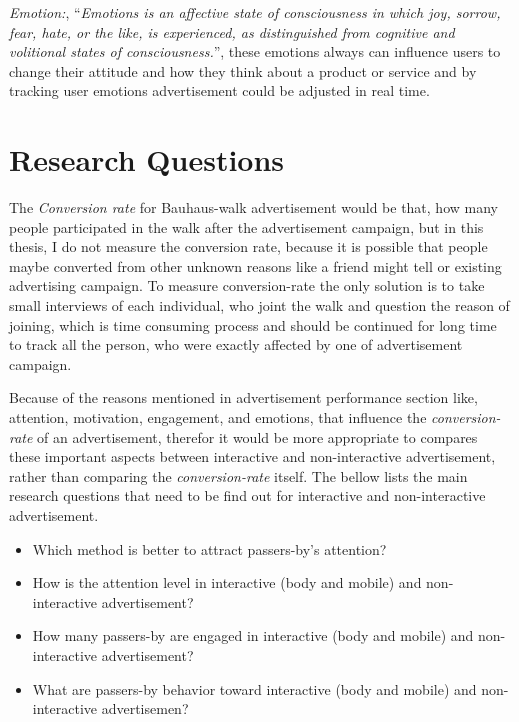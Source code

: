 \emph{Emotion:}, ``\emph{Emotions is an affective state of consciousness in which joy, sorrow, fear, hate, or the like, is experienced, as distinguished from cognitive and volitional states of consciousness.}''\cite{emotiondef}, these emotions always can influence users to change their attitude and how they think about a product or service and by tracking user emotions advertisement could be adjusted in real time.




\section{Research Questions}
The \emph{Conversion rate} for Bauhaus-walk advertisement would be that, how many people participated in the walk after the advertisement campaign, but in this thesis, I do not measure the conversion rate, because it is possible that people maybe converted from other unknown reasons like a friend might tell or existing advertising campaign. To measure conversion-rate the only solution is to take small interviews of each individual, who joint the walk and question the reason of joining, which is time consuming process and should be continued for long time to track all the person, who were exactly affected by one of advertisement campaign.

Because of the reasons mentioned in advertisement performance section like, attention, motivation, engagement, and emotions, that influence the \emph{conversion-rate} of an advertisement, therefor it would be more appropriate to compares these important aspects between interactive and non-interactive advertisement, rather than comparing the \emph{conversion-rate} itself. The bellow lists the main research questions that need to be find out for interactive and non-interactive advertisement.


\begin{itemize}
\item Which method is better to attract passers-by's attention? 
\item How is the attention level in interactive (body and mobile) and non-interactive advertisement?
\item How many passers-by are engaged in interactive (body and mobile) and non-interactive advertisement?
\item What are passers-by behavior toward interactive (body and mobile) and non-interactive advertisemen?
\end{itemize}

